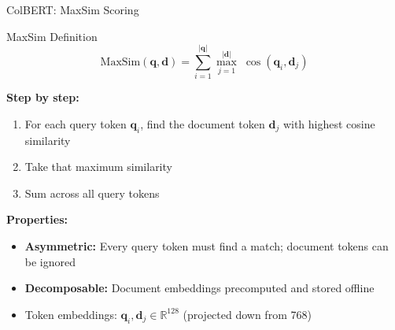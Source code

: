 \documentclass[aspectratio=169]{beamer}
\newif\ifanimated
\newcommand{\cpause}{\ifanimated\pause\fi}
\newcommand{\vq}{\mathbf{q}}
\newcommand{\vd}{\mathbf{d}}
\begin{document}
\begin{frame}[shrink=10]{ColBERT: MaxSim Scoring}
\begin{block}{MaxSim Definition}
$$\text{MaxSim}(\vq, \vd) = \sum_{i=1}^{|\vq|} \max_{j=1}^{|\vd|}\; \cos(\vq_i, \vd_j)$$
\end{block}

\vspace{0.3em}

\textbf{Step by step:}
\begin{enumerate}
    \item For each query token $\vq_i$, find the document token $\vd_j$ with highest cosine similarity
    \item Take that maximum similarity
    \item Sum across all query tokens
\end{enumerate}

\cpause
\vspace{0.5em}

\textbf{Properties:}
\begin{itemize}
    \item \textbf{Asymmetric:} Every query token must find a match; document tokens can be ignored
    \item \textbf{Decomposable:} Document embeddings precomputed and stored offline
    \item Token embeddings: $\vq_i, \vd_j \in \mathbb{R}^{128}$ (projected down from 768)
\end{itemize}
\end{frame}
\end{document}
